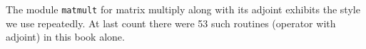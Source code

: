 The module \texttt{matmult}
for matrix multiply along with its adjoint
exhibits the style we use repeatedly.
At last count there were 53 such routines
(operator with adjoint)
in this book alone.
\begin{comment}
Notice the module \texttt{matmult}
does not explicitly erase its output before it begins,
as does the pseudo code.
That is because Loptran will always erase for you
the space required for the operator's output.
Loptran also defines a logical variable {\tt adj}
for you to distinguish your computation of the adjoint
$\bold x=\bold x+\bold B\T \bold y$
from the forward operation
$\bold y=\bold y+\bold B\bold x$. 
In computerese, the two lines beginning \#\% are macro expansions
that take compact bits of information which expand
into the verbose boilerplate that Fortran requires.
Loptran is Fortran with these macro expansions.
You can always see how they expand by looking at
\url{http://sep.stanford.edu/sep/prof/}.

\par
What is new in Fortran 90, and will be a big help to us,
is that instead of a subroutine with a single entry.
\end{comment}

